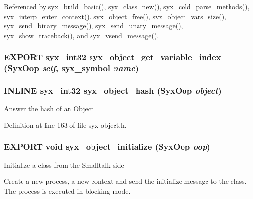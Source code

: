 Referenced by syx\_\-build\_\-basic(), syx\_\-class\_\-new(), syx\_\-cold\_\-parse\_\-methods(), syx\_\-interp\_\-enter\_\-context(), syx\_\-object\_\-free(), syx\_\-object\_\-vars\_\-size(), syx\_\-send\_\-binary\_\-message(), syx\_\-send\_\-unary\_\-message(), syx\_\-show\_\-traceback(), and syx\_\-vsend\_\-message().\hypertarget{syx-object_8h_a0cd5dad65ba23e0dc1381396b283ab8}{
\subsubsection{\setlength{\rightskip}{0pt plus 5cm}EXPORT {\bf syx\_\-int32} syx\_\-object\_\-get\_\-variable\_\-index ({\bf SyxOop} {\em self}, \/  {\bf syx\_\-symbol} {\em name})}}
\label{syx-object_8h_a0cd5dad65ba23e0dc1381396b283ab8}


\hypertarget{syx-object_8h_d8c2625c436ff85103279e5d78f078a5}{
\subsubsection{\setlength{\rightskip}{0pt plus 5cm}INLINE {\bf syx\_\-int32} syx\_\-object\_\-hash ({\bf SyxOop} {\em object})}}
\label{syx-object_8h_d8c2625c436ff85103279e5d78f078a5}


Answer the hash of an Object 

Definition at line 163 of file syx-object.h.\hypertarget{syx-object_8h_00a861ab5f7d7224796beb8f9bf42296}{
\subsubsection{\setlength{\rightskip}{0pt plus 5cm}EXPORT void syx\_\-object\_\-initialize ({\bf SyxOop} {\em oop})}}
\label{syx-object_8h_00a861ab5f7d7224796beb8f9bf42296}


Initialize a class from the Smalltalk-side

Create a new process, a new context and send the initialize message to the class. The process is executed in blocking mode.


